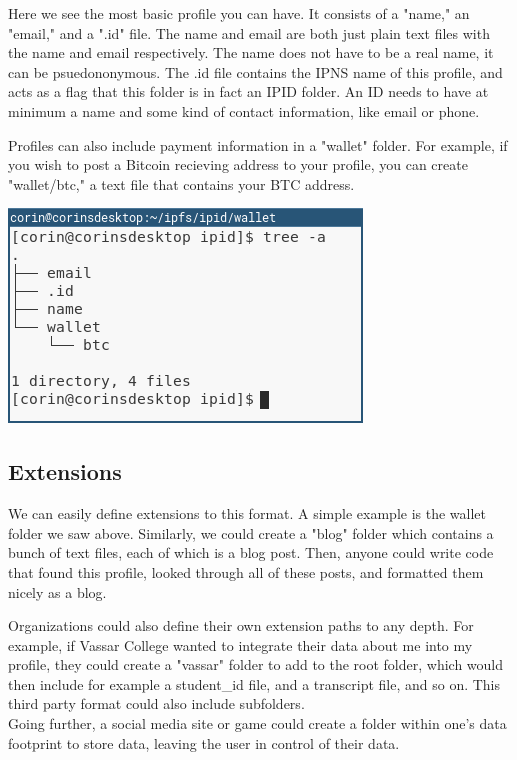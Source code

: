 \documentclass{article}
\begin{document}
Here we see the most basic profile you can have. It consists of a "name," an "email," and a ".id" file. The name and email are both just plain text files with the name and email respectively. The name does not have to be a real name, it can be psuedononymous. The .id file contains the IPNS name of this profile, and acts as a flag that this folder is in fact an IPID folder. An ID needs to have at minimum a name and some kind of contact information, like email or phone. \par
Profiles can also include payment information in a "wallet" folder. For example, if you wish to post a Bitcoin recieving address to your profile, you can create "wallet/btc," a text file that contains your BTC address.

\begin{center}
  \includegraphics[width=.5\textwidth]{resources/basic_profile_wallet.png}
\end{center}

\subsection{Extensions}

We can easily define extensions to this format. A simple example is the wallet folder we saw above. Similarly, we could create a "blog" folder which contains a bunch of text files, each of which is a blog post. Then, anyone could write code that found this profile, looked through all of these posts, and formatted them nicely as a blog. \par
Organizations could also define their own extension paths to any depth. For example, if Vassar College wanted to integrate their data about me into my profile, they could create a "vassar" folder to add to the root folder, which would then include for example a student\_id file, and a transcript file, and so on. This third party format could also include subfolders. \\
Going further, a social media site or game could create a folder within one's data footprint to store data, leaving the user in control of their data. 
\end{document}
